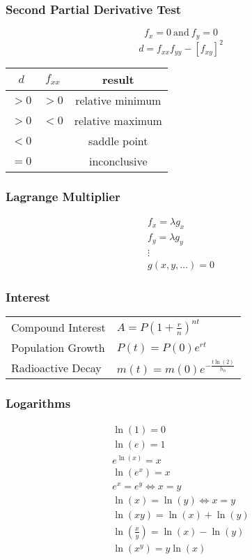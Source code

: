 \documentclass[letterpaper,12pt,fleqn]{article}
\renewcommand{\l}{\lambda}
\begin{document}
\subsubsection*{Second Partial Derivative Test}

\[f_x=0\ \text{and}\ f_y=0\]
\[d=f_{xx}f_{yy}-[f_{xy}]^2\]
\begin{tabular}{c|c|c}
  \(d\) & \(f_{xx}\) & result \\
  \hline
  \(>0\) & \(>0\) & relative minimum \\
  \(>0\) & \(<0\) & relative maximum \\
  \(<0\) & & saddle point \\
  \(=0\) & & inconclusive
\end{tabular}

\subsubsection*{Lagrange Multiplier}

\begin{gather*}
f_x=\l g_x \\
f_y=\l g_y \\
\vdots \\
g(x,y,\ldots)=0
\end{gather*}

\subsubsection*{Interest}

\begin{tabular}{ll}
  Compound Interest & \(A=P\left(1+\frac{r}{n}\right)^{nt}\) \\
  Population Growth & \(P(t)=P(0)e^{rt}\) \\
  Radioactive Decay & \(m(t)=m(0)e^{-\frac{t\ln(2)}{h_0}}\)
\end{tabular}

\subsubsection*{Logarithms}

\begin{gather*}
  \ln(1)=0 \\
  \ln(e)=1 \\
  e^{\ln(x)}=x \\
  \ln(e^x)=x \\
  e^x=e^y\iff x=y \\
  \ln(x)=\ln(y)\iff x=y \\
  \ln(xy)=\ln(x)+\ln(y) \\
  \ln\left(\frac{x}{y}\right)=\ln(x)-\ln(y) \\
  \ln\left(x^y\right)=y\ln(x)
\end{gather*}
\end{document}
